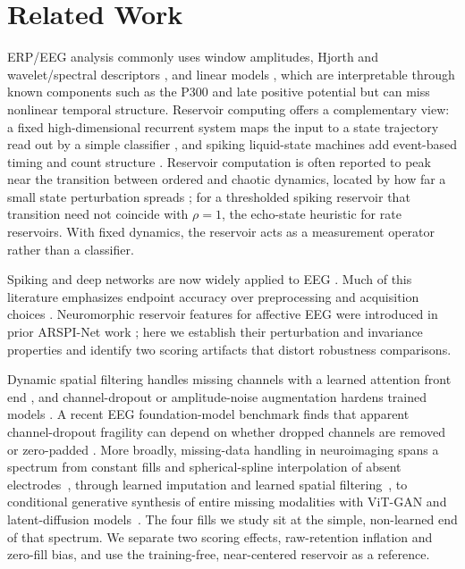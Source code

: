 \documentclass[conference]{IEEEtran}
\begin{document}
\section{Related Work}
\label{sec:related}
ERP/EEG analysis commonly uses window amplitudes, Hjorth \cite{hjorth1970eeg} and wavelet/spectral descriptors \cite{subasi2007eeg}, and linear models \cite{blankertz2011singletrial}, which are interpretable through known components such as the P300 and late positive potential \cite{makeig2002dynamic} but can miss nonlinear temporal structure. Reservoir computing offers a complementary view: a fixed high-dimensional recurrent system maps the input to a state trajectory read out by a simple classifier \cite{maass2002real,jaeger2001echo,jaeger2004harnessing,lukosevicius2009reservoir}, and spiking liquid-state machines add event-based timing and count structure \cite{diehl2015unsupervised,roy2019towards}. Reservoir computation is often reported to peak near the transition between ordered and chaotic dynamics, located by how far a small state perturbation spreads \cite{bertschinger2004realtime,legenstein2007edge}; for a thresholded spiking reservoir that transition need not coincide with $\rho=1$, the echo-state heuristic for rate reservoirs. With fixed dynamics, the reservoir acts as a measurement operator rather than a classifier.

Spiking and deep networks are now widely applied to EEG \cite{gong2023sglnet,lawhern2018eegnet,craik2019deep}. Much of this literature emphasizes endpoint accuracy over preprocessing and acquisition choices \cite{delpup2025preprocessing,kornblith2019similarity}. Neuromorphic reservoir features for affective EEG were introduced in prior ARSPI-Net work \cite{lane2023arspi,lane2024arspi}; here we establish their perturbation and invariance properties and identify two scoring artifacts that distort robustness comparisons.

Dynamic spatial filtering handles missing channels with a learned attention front end \cite{banville2022dsf}, and channel-dropout or amplitude-noise augmentation hardens trained models \cite{rommel2022augment}. A recent EEG foundation-model benchmark finds that apparent channel-dropout fragility can depend on whether dropped channels are removed or zero-padded \cite{sirca2026beyond}. More broadly, missing-data handling in neuroimaging spans a spectrum from constant fills and spherical-spline interpolation of absent electrodes~\cite{perrin1989spherical}, through learned imputation and learned spatial filtering~\cite{banville2022dsf}, to conditional generative synthesis of entire missing modalities with ViT-GAN and latent-diffusion models~\cite{bi2024graymatters,hu2025gmldm}. The four fills we study sit at the simple, non-learned end of that spectrum. We separate two scoring effects, raw-retention inflation and zero-fill bias, and use the training-free, near-centered reservoir as a reference.
\end{document}
